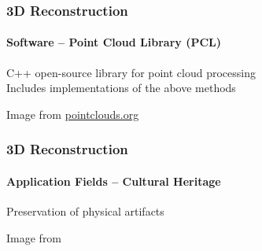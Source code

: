 \documentclass[xetex,professionalfont]{beamer}
\begin{document}

\begin{frame}
\frametitle{3D Reconstruction}
\framesubtitle{Software -- Point Cloud Library (PCL)}

C++ open-source library for point cloud processing\\\medskip
Includes implementations of the above methods

\bigskip
\begin{center}
    {\centering Image from \url{pointclouds.org}}
\end{center}

\end{frame}


\begin{frame}
\frametitle{3D Reconstruction}
\framesubtitle{Application Fields -- Cultural Heritage} %

Preservation of physical artifacts

\bigskip
\begin{center}
    {\centering Image from \cite{levoy2000}}
\end{center}

\end{frame}

\end{document}
